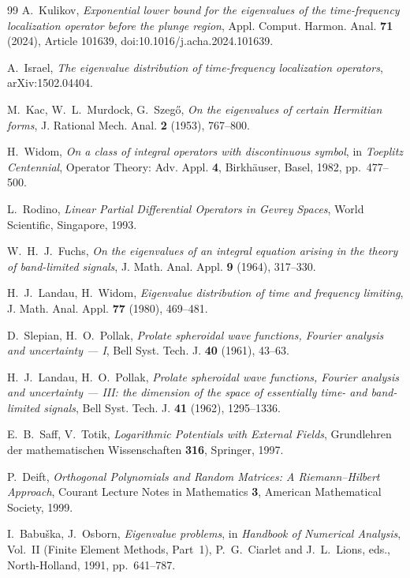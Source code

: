 \documentclass[11pt,a4paper]{article}
\begin{document}
\begin{thebibliography}{99}
A.~Kulikov,
\emph{Exponential lower bound for the eigenvalues of the time-frequency
localization operator before the plunge region}, Appl. Comput. Harmon. Anal.
\textbf{71} (2024), Article 101639, doi:10.1016/j.acha.2024.101639.

A.~Israel,
\emph{The eigenvalue distribution of time-frequency localization operators},
arXiv:1502.04404.

M.~Kac, W.~L.~Murdock, G.~Szeg\H{o},
\emph{On the eigenvalues of certain Hermitian forms},
J. Rational Mech. Anal. \textbf{2} (1953), 767--800.

H.~Widom,
\emph{On a class of integral operators with discontinuous symbol},
in \emph{Toeplitz Centennial}, Operator Theory: Adv. Appl. \textbf{4},
Birkh\"auser, Basel, 1982, pp.~477--500.

L.~Rodino,
\emph{Linear Partial Differential Operators in Gevrey Spaces},
World Scientific, Singapore, 1993.

W.~H.~J.~Fuchs,
\emph{On the eigenvalues of an integral equation arising in the theory of
band-limited signals}, J. Math. Anal. Appl. \textbf{9} (1964), 317--330.

H.~J.~Landau, H.~Widom,
\emph{Eigenvalue distribution of time and frequency limiting},
J. Math. Anal. Appl. \textbf{77} (1980), 469--481.

D.~Slepian, H.~O.~Pollak,
\emph{Prolate spheroidal wave functions, Fourier analysis and uncertainty --- I},
Bell Syst. Tech. J. \textbf{40} (1961), 43--63.

H.~J.~Landau, H.~O.~Pollak,
\emph{Prolate spheroidal wave functions, Fourier analysis and uncertainty ---
III: the dimension of the space of essentially time- and band-limited signals},
Bell Syst. Tech. J. \textbf{41} (1962), 1295--1336.

E.~B.~Saff, V.~Totik,
\emph{Logarithmic Potentials with External Fields},
Grundlehren der mathematischen Wissenschaften \textbf{316}, Springer, 1997.

P.~Deift,
\emph{Orthogonal Polynomials and Random Matrices: A Riemann--Hilbert Approach},
Courant Lecture Notes in Mathematics \textbf{3}, American Mathematical Society,
1999.

I.~Babu\v{s}ka, J.~Osborn,
\emph{Eigenvalue problems}, in \emph{Handbook of Numerical Analysis}, Vol.~II
(Finite Element Methods, Part~1), P.~G.~Ciarlet and J.~L.~Lions, eds.,
North-Holland, 1991, pp.~641--787.



\end{thebibliography}
\end{document}
